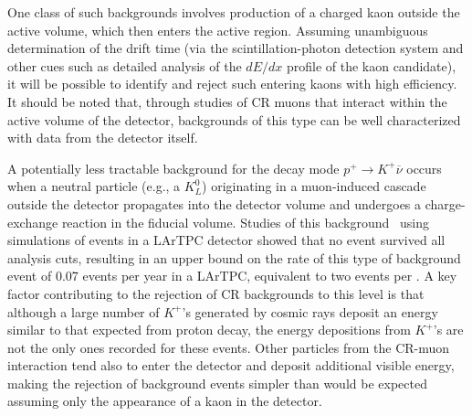 One class of such backgrounds involves production of a charged kaon 
outside the active volume, which then enters the active region.  
Assuming unambiguous determination of the drift time (via the 
scintillation-photon detection system and other cues such as 
detailed analysis of the $dE/dx$ profile of the kaon candidate), 
it will be possible to identify and reject such entering kaons 
with high efficiency.  It should be noted that, through studies 
of CR muons that interact within the active volume of the 
detector, backgrounds of this type can be well characterized 
with data from the detector itself.

A potentially less tractable background 
for the decay mode $p^+ \rightarrow K^+\overline{\nu}$
occurs when a neutral particle (e.g., a $K^0_L$) originating in a
muon-induced cascade outside the detector propagates into the detector
volume and undergoes a charge-exchange reaction in the fiducial
volume.  Studies of this background~\cite{lbne-sciopp} using simulations of
events in a  LArTPC detector showed
%
that no event survived all analysis cuts, resulting in an
upper bound on the rate of this type of background event of 0.07
events per year in a  LArTPC, equivalent to two events per 
 \SI{}{\Mtyr}.  A key factor contributing to the rejection of 
CR backgrounds to this level is that although a large number 
of $K^+$'s generated by cosmic rays deposit an 
energy similar to that expected from proton decay, the
energy depositions from $K^+$'s are not the only ones recorded for
these events.  Other particles from the CR-muon interaction 
tend also to enter the detector and deposit additional visible
energy, making the rejection of background events simpler than
would be expected assuming only the appearance of a kaon in the detector.

